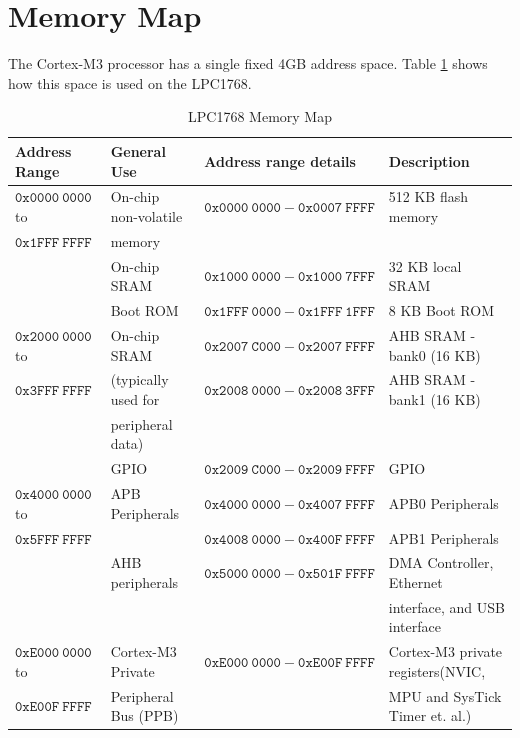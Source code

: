 \section{Memory Map}
The Cortex-M3 processor has a single fixed 4GB address space.  
Table \ref{tb_lpc1768_mem} shows how this space is used on the LPC1768.
\begin{table}[ht]
\begin{center}
\footnotesize{
\begin{tabular} {llll}
\\ \hline
Address Range & General Use & Address range details & Description \\ 
\hline \hline
$\mathtt{0x0000~0000}$ to & On-chip non-volatile  
    & $\mathtt{0x0000~0000 - 0x0007~FFFF}$ & 512 KB flash memory \\ 

$\mathtt{0x1FFF~FFFF}$    & memory \\
                 & On-chip SRAM & $\mathtt{0x1000~0000 - 0x1000~7FFF}$ 
                 & 32 KB local SRAM \\
                 & Boot ROM & $\mathtt{0x1FFF~0000 - 0x1FFF~1FFF}$
                 & 8 KB Boot ROM\\ 
\hline
$\mathtt{0x2000~0000}$ to & On-chip SRAM
    & $\mathtt{0x2007~C000 - 0x2007~FFFF}$ & AHB SRAM - bank0 (16 KB) \\
$\mathtt{0x3FFF~FFFF}$    & (typically used for
    & $\mathtt{0x2008~0000 - 0x2008~3FFF}$ & AHB SRAM - bank1 (16 KB) \\
                          & peripheral data) \\
                          & GPIO
    & $\mathtt{0x2009~C000 - 0x2009~FFFF}$ & GPIO \\
\hline
$\mathtt{0x4000~0000}$ to & APB Peripherals
    & $\mathtt{0x4000~0000 - 0x4007~FFFF}$ & APB0 Peripherals \\
$\mathtt{0x5FFF~FFFF}$ & 
    & $\mathtt{0x4008~0000 - 0x400F~FFFF}$ & APB1 Peripherals \\
                          & AHB peripherals 
    & $\mathtt{0x5000~0000 - 0x501F~FFFF}$ & DMA Controller, Ethernet  \\
                                         &&& interface, and USB interface \\
\hline
$\mathtt{0xE000~0000}$ to & Cortex-M3 Private 
    & $\mathtt{0xE000~0000 - 0xE00F~FFFF}$ & Cortex-M3 private registers(NVIC, \\
$\mathtt{0xE00F~FFFF}$   & Peripheral Bus (PPB) && MPU and SysTick Timer et. al.) \\
\hline
\end{tabular}
\caption{LPC1768 Memory Map}
\label{tb_lpc1768_mem}
}
\end{center}
\end{table}

